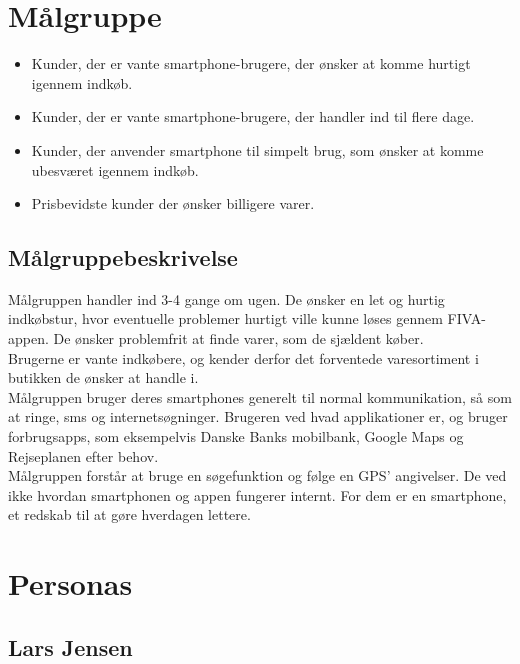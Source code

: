\documentclass[12pt]{article}
\begin{document}
\begin{enumarate}
\section*{Målgruppe}
\begin{itemize}
\item Kunder, der er vante smartphone-brugere, der ønsker at komme hurtigt igennem indkøb.
\item Kunder, der er vante smartphone-brugere, der handler ind til flere dage.
\item Kunder, der anvender smartphone til simpelt brug, som ønsker at komme ubesværet igennem indkøb.
\item Prisbevidste kunder der ønsker billigere varer.
\end{itemize}

\subsection*{Målgruppebeskrivelse}
Målgruppen handler ind 3-4 gange om ugen. De ønsker en let og hurtig indkøbstur, hvor eventuelle problemer hurtigt ville kunne løses gennem FIVA-appen. De ønsker problemfrit at finde varer, som de sjældent køber.\\
Brugerne er vante indkøbere, og kender derfor det forventede varesortiment i butikken de ønsker at handle i.\\

\noindent Målgruppen bruger deres smartphones generelt til normal kommunikation, så som at ringe, sms og internetsøgninger. Brugeren ved hvad applikationer er, og bruger forbrugsapps, som eksempelvis Danske Banks mobilbank, Google Maps og Rejseplanen efter behov.\\

\noindent Målgruppen forstår at bruge en søgefunktion og følge en GPS' angivelser. De ved ikke hvordan smartphonen og appen fungerer internt. For dem er en smartphone, et redskab til at gøre hverdagen lettere.

\section*{Personas}

\subsection*{Lars Jensen}


\end{enumarate}
\end{document}
